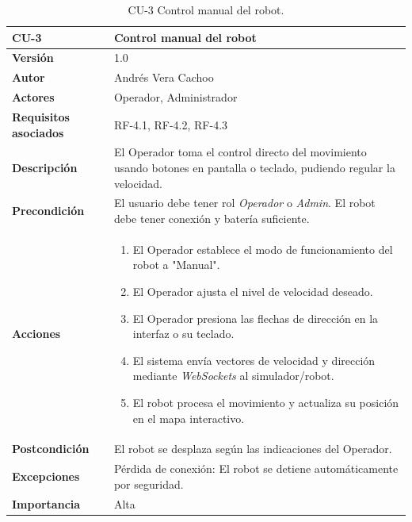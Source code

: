 \begin{table}[H]
	\centering
	\begin{tabularx}{\linewidth}{ p{} p{} }
		\toprule
		\textbf{CU-3}    & \textbf{Control manual del robot}\\
		\toprule
		\textbf{Versión}              & 1.0    \\
		\textbf{Autor}                & Andrés Vera Cachoo \\
		\textbf{Actores}              & Operador, Administrador \\
		\textbf{Requisitos asociados} & RF-4.1, RF-4.2, RF-4.3 \\
		\textbf{Descripción}          & El Operador toma el control directo del movimiento usando botones en pantalla o teclado, pudiendo regular la velocidad. \\
		\textbf{Precondición}         & El usuario debe tener rol \textit{Operador} o \textit{Admin}. El robot debe tener conexión y batería suficiente. \\
		\textbf{Acciones}             &
		\begin{enumerate}
			\def\labelenumi{\arabic{enumi}.}
			\tightlist
			\item El Operador establece el modo de funcionamiento del robot a "Manual".
            \item El Operador ajusta el nivel de velocidad deseado.
			\item El Operador presiona las flechas de dirección en la interfaz o su teclado.
			\item El sistema envía vectores de velocidad y dirección mediante \textit{WebSockets} al simulador/robot.
            \item El robot procesa el movimiento y actualiza su posición en el mapa interactivo.
		\end{enumerate}\\
		\textbf{Postcondición}        & El robot se desplaza según las indicaciones del Operador. \\
		\textbf{Excepciones}          & Pérdida de conexión: El robot se detiene automáticamente por seguridad. \\
		\textbf{Importancia}          & Alta \\
		\bottomrule
	\end{tabularx}
	\caption{CU-3 Control manual del robot.}
\end{table}

